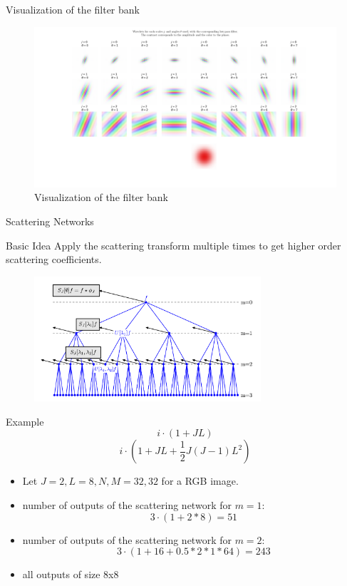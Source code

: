 \documentclass[compress]{beamer}
\begin{document}
	\begin{frame}{Visualization of the filter bank}
		\begin{figure}[!htb]
			\centering
			\includegraphics[width=\textwidth]{images/filter_bank_vis.png}
			\caption{Visualization of the filter bank}
			\label{fig:viz_filter_bank}
		\end{figure}
	\end{frame}
	\begin{frame}{Scattering Networks}
		\begin{block}{Basic Idea}
			Apply the scattering transform multiple times to get higher order scattering coefficients.
		\end{block}
		\begin{figure}[!htb]
			\centering
			\includegraphics[width = 0.75\textwidth]{images/scattering_network.png}
			\caption{}
			\label{fig:scattering_network}
		\end{figure}
	\end{frame}
	\begin{frame}{Example}
		\begin{equation}
		i \cdot (1 + JL) 
		\label{eq:order1_num_filters}
		\end{equation} 
		\begin{equation}
		i \cdot (1 + JL + \frac{1}{2}J(J-1)L^2)
		\label{eq:order2_num_filters}
		\end{equation}
		\begin{itemize}
			\item Let $J=2, L=8, N,M=32,32$ for a RGB image.
			\item number of outputs of the scattering network for $m=1$:
			$$ 3\cdot (1 + 2 * 8) = 51$$
			\item number of outputs of the scattering network for $m=2$:
			$$ 3 \cdot (1 + 16 + 0.5*2*1 * 64) = 243$$
			\item all outputs of size 8x8
		\end{itemize}
	\end{frame}
\end{document}
